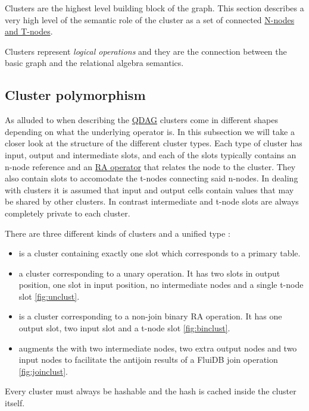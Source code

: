 Clusters are the highest level building block of the graph. This
section describes a very high level of the semantic role of the
cluster as a set of connected \hyperref[sec:org5a9ec3b]{N-nodes and
  T-nodes}.

Clusters represent \emph{logical operations} and they are the connection
between the basic graph and the relational algebra semantics.

\subsection{Cluster polymorphism}

As alluded to when describing the \hyperref[sec:org5a9ec3b]{QDAG}
clusters come in different shapes depending on what the underlying
operator is. In this subsection we will take a closer look at the
structure of the different cluster types. Each type of cluster has
input, output and intermediate slots, and each of the slots typically
contains an n-node reference and an
\hyperref[sec:relational_algebra_semantics]{RA operator} that relates
the node to the cluster. They also contain slots to accomodate the
t-nodes connecting said n-nodes. In dealing with clusters it is
assumed that input and output cells contain values that may be shared
by other clusters. In contrast intermediate and t-node slots are
always completely private to each cluster.

There are three different kinds of clusters and a unified type
:

\begin{itemize}
\item {} is a cluster containing exactly one slot which
  corresponds to a primary table.
\item {} a cluster corresponding to a unary operation. It
  has two slots in output position, one slot in input position, no
  intermediate nodes and a single t-node slot \ref{fig:unclust}.
\item {} is a cluster corresponding to a non-join binary
  RA operation. It has one output slot, two input slot and a t-node
  slot \ref{fig:binclust}.
\item {} augments the  with two
  intermediate nodes, two extra output nodes and two input nodes to
  facilitate the antijoin results of a FluiDB join operation
  \ref{fig:joinclust}.
\end{itemize}

Every cluster must always be hashable and the hash is cached inside
the cluster itself.

